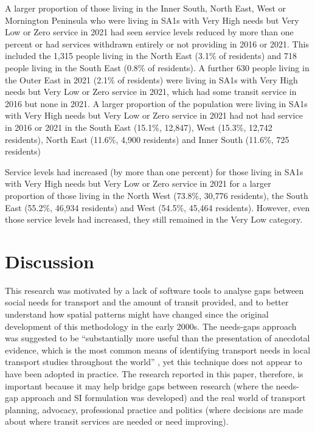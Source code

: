 \documentclass[preprint, 3p,
authoryear]{elsarticle} %
\begin{document}
A larger proportion of those living in the Inner South, North East, West
or Mornington Peninsula who were living in SA1s with Very High needs but
Very Low or Zero service in 2021 had seen service levels reduced by more
than one percent or had services withdrawn entirely or not providing in
2016 or 2021. This included the 1,315 people living in the North East
(3.1\% of residents) and 718 people living in the South East (0.8\% of
residents). A further 630 people living in the Outer East in 2021 (2.1\%
of residents) were living in SA1s with Very High needs but Very Low or
Zero service in 2021, which had some transit service in 2016 but none in
2021. A larger proportion of the population were living in SA1s with
Very High needs but Very Low or Zero service in 2021 had not had service
in 2016 or 2021 in the South East (15.1\%, 12,847), West (15.3\%, 12,742
residents), North East (11.6\%, 4,900 residents) and Inner South
(11.6\%, 725 residents)

Service levels had increased (by more than one percent) for those living
in SA1s with Very High needs but Very Low or Zero service in 2021 for a
larger proportion of those living in the North West (73.8\%, 30,776
residents), the South East (55.2\%, 46,934 residents) and West (54.5\%,
45,464 residents). However, even those service levels had increased,
they still remained in the Very Low category.

\hypertarget{discussion}{%
\section{Discussion}\label{discussion}}

This research was motivated by a lack of software tools to analyse gaps
between social needs for transport and the amount of transit provided,
and to better understand how spatial patterns might have changed since
the original development of this methodology in the early 2000s. The
needs-gaps approach was suggested to be ``substantially more useful than
the presentation of anecdotal evidence, which is the most common means
of identifying transport needs in local transport studies throughout the
world'' \citep{currie2010identifying}, yet this technique does not
appear to have been adopted in practice. The research reported in this
paper, therefore, is important because it may help bridge gaps between
research (where the needs-gap approach and SI formulation was developed)
and the real world of transport planning, advocacy, professional
practice and politics (where decisions are made about where transit
services are needed or need improving).
\end{document}
